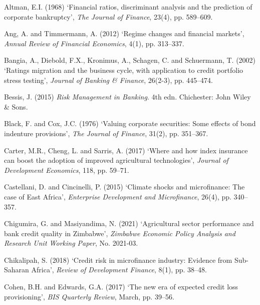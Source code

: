 \documentclass[12pt,a4paper]{article}
\begin{document}
\begin{description}[style=nextline, leftmargin=0pt, labelwidth=0pt, itemsep=0.5em]

\item Altman, E.I. (1968) `Financial ratios, discriminant analysis and the prediction of corporate bankruptcy', \textit{The Journal of Finance}, 23(4), pp. 589--609.

\item Ang, A. and Timmermann, A. (2012) `Regime changes and financial markets', \textit{Annual Review of Financial Economics}, 4(1), pp. 313--337.

\item Bangia, A., Diebold, F.X., Kronimus, A., Schagen, C. and Schuermann, T. (2002) `Ratings migration and the business cycle, with application to credit portfolio stress testing', \textit{Journal of Banking \& Finance}, 26(2-3), pp. 445--474.

\item Bessis, J. (2015) \textit{Risk Management in Banking}. 4th edn. Chichester: John Wiley \& Sons.

\item Black, F. and Cox, J.C. (1976) `Valuing corporate securities: Some effects of bond indenture provisions', \textit{The Journal of Finance}, 31(2), pp. 351--367.

\item Carter, M.R., Cheng, L. and Sarris, A. (2017) `Where and how index insurance can boost the adoption of improved agricultural technologies', \textit{Journal of Development Economics}, 118, pp. 59--71.

\item Castellani, D. and Cincinelli, P. (2015) `Climate shocks and microfinance: The case of East Africa', \textit{Enterprise Development and Microfinance}, 26(4), pp. 340--357.

\item Chigumira, G. and Masiyandima, N. (2021) `Agricultural sector performance and bank credit quality in Zimbabwe', \textit{Zimbabwe Economic Policy Analysis and Research Unit Working Paper}, No. 2021-03.

\item Chikalipah, S. (2018) `Credit risk in microfinance industry: Evidence from Sub-Saharan Africa', \textit{Review of Development Finance}, 8(1), pp. 38--48.

\item Cohen, B.H. and Edwards, G.A. (2017) `The new era of expected credit loss provisioning', \textit{BIS Quarterly Review}, March, pp. 39--56.


\end{description}
\end{document}
